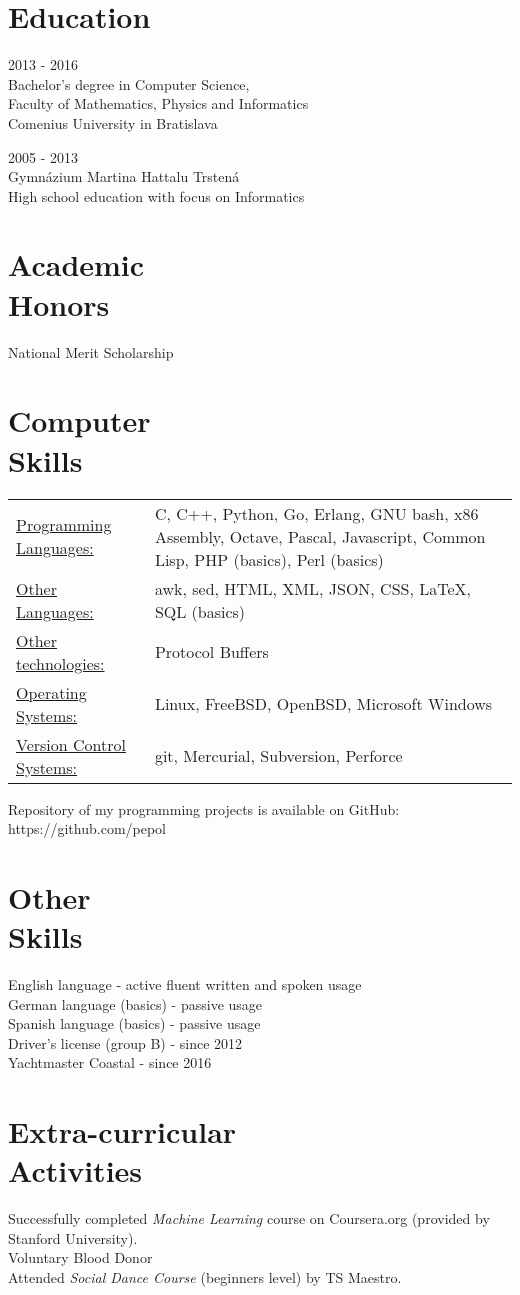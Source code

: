 \documentclass[margin]{res}
\begin{document}
\begin{resume}
\section{Education}
2013 - 2016 \\
Bachelor's degree in Computer Science, \\ 
Faculty of Mathematics, Physics and Informatics \\
Comenius University in Bratislava

2005 - 2013 \\
Gymn\'{a}zium Martina Hattalu Trsten\'{a} \\
High school education with focus on Informatics

\section{Academic \\ Honors}
National Merit Scholarship

\section{Computer \\ Skills}
   \begin{tabular}{l p{3in}}
       \underline{Programming Languages:} & C, C++, Python, Go, Erlang, GNU bash, x86 Assembly, Octave, Pascal, Javascript, Common Lisp, PHP (basics), Perl (basics) \\
       \underline{Other Languages:} & awk, sed, HTML, XML, JSON, CSS, \LaTeX, SQL (basics) \\

       \underline{Other technologies:} & Protocol Buffers \\
       \underline{Operating Systems:} & Linux, FreeBSD, OpenBSD, Microsoft Windows \\
       \underline{Version Control Systems:} & git, Mercurial, Subversion, Perforce
 \end{tabular}

Repository of my programming projects is available on GitHub: https://github.com/pepol

\section{Other \\ Skills}
English language - active fluent written and spoken usage \\
German language (basics) - passive usage \\
Spanish language (basics) - passive usage \\
Driver's license (group B) - since 2012 \\
Yachtmaster Coastal - since 2016

\section{Extra-curricular \\ Activities}
Successfully completed {\it Machine Learning} course on Coursera.org (provided by Stanford University). \\
Voluntary Blood Donor \\
Attended {\it Social Dance Course} (beginners level) by TS Maestro.
\end{resume}
\end{document}
